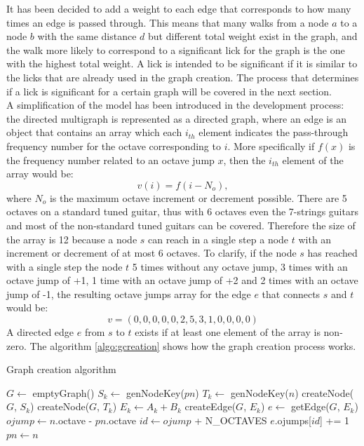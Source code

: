 \documentclass{llncs}
\begin{document}
It has been decided to add a weight to each edge that corresponds to how many
times an edge is passed through. This means that many walks
from a node $a$ to a node $b$ with the same distance $d$ but different
total weight exist in the graph, and the walk more likely
to correspond to a significant lick for the graph is the one with the
highest total weight. A lick is intended to be significant if it is
similar to the licks that are already used in the graph creation. The
process that determines if a lick is significant for a certain graph will
be covered in the next section.\\
A simplification of the model has been introduced in the development
process: the directed multigraph is represented as a directed graph,
where an edge is an object that contains an array which each $i_{th}$ element
indicates the pass-through frequency number for the octave corresponding
to $i$. More specifically if $f(x)$ is the frequency number related to
an octave jump $x$, then the $i_{th}$ element of the array would be:
\[ v(i) = f(i - N_o), \]
where $N_o$ is the maximum octave increment or decrement possible.
There are 5 octaves on a standard tuned guitar, thus with 6 octaves even
the 7-strings guitars and most of the non-standard tuned guitars can be
covered. Therefore the size of the array is 12 because a node $s$ can reach
in a single step a node $t$ with an increment or decrement of at most 6
octaves. To clarify, if the node $s$ has reached with a
single step the node
$t$ 5 times without any octave jump, 3 times with an octave jump of +1, 
1 time with an octave jump of +2
and 2 times with an octave jump of -1, the resulting octave jumps array
for the edge $e$ that connects $s$ and $t$ would be:
\[ v = (0,0,0,0,0,2,5,3,1,0,0,0,0) \]
 A directed edge $e$ from $s$ to $t$ exists if at least one
element of the array is non-zero.
The algorithm \ref{algo:gcreation} shows how the graph creation process
works.
\begin{algorithm}
\caption{Graph creation algorithm}
\label{algo:gcreation}
\begin{algorithmic}[1]
	\State $G \gets $ emptyGraph()
				\State $S_k \gets $ genNodeKey($pn$)
				\State $T_k \gets $ genNodeKey($n$)
					\State createNode($G$, $S_k$)
				\EndIf
					\State createNode($G$, $T_k$)
				\EndIf
				\State $E_k\gets A_k + B_k$ 
				\small
					\State createEdge($G$, $E_k$)
				\EndIf
				\State $e \gets$ getEdge($G$, $E_k$)
				\State $ojump \gets n$.octave - $pn$.octave 
				\State $id \gets ojump$ + N\_OCTAVES
				\small
				\State $e$.ojumps[$id$] += 1
			\EndIf
			\State $pn \gets n$
		\EndFor
	\EndFor
\EndFunction
\end{algorithmic}
\end{algorithm}
\end{document}
